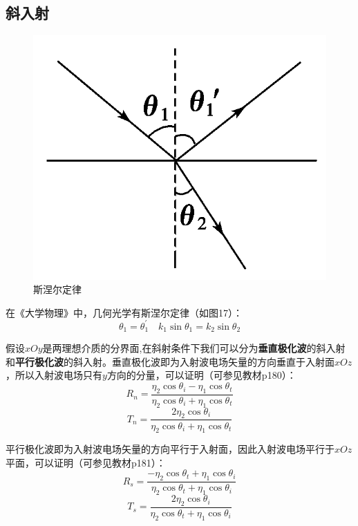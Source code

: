 \documentclass[UTF8,a4paper,11pt]{article}
\begin{document}
\subsection{斜入射}
\begin{figure}[htbp]
\centering
\includegraphics[scale=0.2]{p17.png}
\caption{斯涅尔定律}
\end{figure}

在《大学物理》中，几何光学有斯涅尔定律（如图17）：
\begin{equation}
\theta_1=\theta_1^{'}\quad k_1\sin\theta_1=k_2\sin\theta_2
\end{equation}

假设$xOy$是两理想介质的分界面,在斜射条件下我们可以分为\textbf{垂直极化波}的斜入射和\textbf{平行极化波}的斜入射。垂直极化波即为入射波电场矢量的方向垂直于入射面$xOz$，所以入射波电场只有$y$方向的分量，可以证明（可参见教材p180）：
\begin{equation}
R_n=\frac{\eta_2\cos\theta_i-\eta_1\cos\theta_t}{\eta_2\cos\theta_i+\eta_1\cos\theta_t}
\end{equation}
\begin{equation}
T_n=\frac{2\eta_2\cos\theta_i}{\eta_2\cos\theta_i+\eta_1\cos\theta_t}
\end{equation}

平行极化波即为入射波电场矢量的方向平行于入射面，因此入射波电场平行于$xOz$平面，可以证明（可参见教材p181）：
\begin{equation}
R_s=\frac{-\eta_2\cos\theta_t+\eta_1\cos\theta_i}{\eta_2\cos\theta_t+\eta_1\cos\theta_i}
\end{equation}
\begin{equation}
T_s=\frac{2\eta_2\cos\theta_i}{\eta_2\cos\theta_t+\eta_1\cos\theta_i}
\end{equation}
\end{document}
